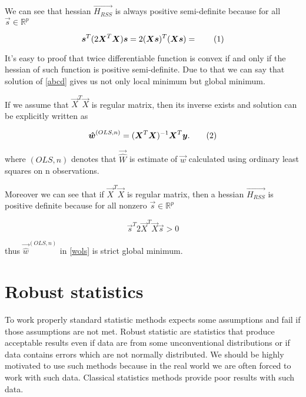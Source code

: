 We can see that hessian $\vec{H_{RSS}}$ is always positive semi-definite because for all $\vec{s} \in \mathbb{R}^p$



\begin{equation}
    \vec{s}^T(2\vec{X}^T\vec{X})\vec{s} = 2(\vec{X}\vec{s})^T(\vec{X}\vec{s}) =  \numberthis
\end{equation}

It's easy to proof that twice differentiable function is convex if and only if the hessian of such function is positive semi-definite. Due to that we can say that solution of \eqref{abcd} gives us not only local minimum but global minimum. 

If we assume that $\vec{X}^T\vec{X}$ is regular matrix, then its inverse exists and solution can be explicitly written as


\begin{equation}
    \vec{\hat{w}}^{(OLS,n)} = (\vec{X}^T\vec{X})^{-1}\vec{X}^T\vec{y}. \numberthis \label{wols}
\end{equation}

where $(OLS,n)$ denotes that $\vec{\hat{W}}$ is estimate of $\vec{w}$ calculated using ordinary least squares on n observations. 

Moreover we can see that if $\vec{X}^T\vec{X}$ is regular matrix, then a hessian $\vec{H_{RSS}}$ is positive definite because for all nonzero $\vec{s} \in \mathbb{R}^p$


\begin{equation}
    \vec{s}^T 2\vec{X}^T\vec{X} \vec{s} > 0
\end{equation}

thus $\vec{\hat{w}}^{(OLS,n)}$ in \eqref{wols} is strict global minimum.




\section{Robust statistics}
To work properly standard statistic methods expects some assumptions and fail if those assumptions are not met. Robust statistic are statistics that produce acceptable results even if data are from some unconventional distributions or if data contains errors which are not normally distributed. We should be highly motivated to use such methods because in the real world we are often forced to work with such data. Classical statistics methods provide poor results with such data. 

